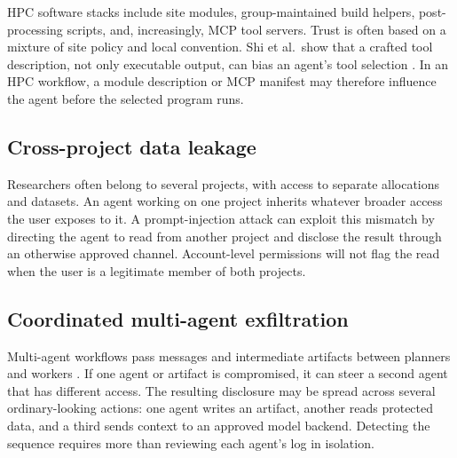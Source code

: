HPC software stacks include site modules, group-maintained build helpers, post-processing scripts, and, increasingly, MCP tool servers. Trust is often based on a mixture of site policy and local convention. Shi et al.\ show that a crafted tool description, not only executable output, can bias an agent's tool selection \cite{Shi2025ToolHijacker}. In an HPC workflow, a module description or MCP manifest may therefore influence the agent before the selected program runs.

\subsection{Cross-project data leakage}
\label{sec:cross-project}

Researchers often belong to several projects, with access to separate allocations and datasets. An agent working on one project inherits whatever broader access the user exposes to it. A prompt-injection attack can exploit this mismatch by directing the agent to read from another project and disclose the result through an otherwise approved channel. Account-level permissions will not flag the read when the user is a legitimate member of both projects.

\subsection{Coordinated multi-agent exfiltration}
\label{sec:taxonomy-multiagent}

Multi-agent workflows pass messages and intermediate artifacts between planners and workers \cite{Rosendo2025ORNL,Mondesire2025PEARC}. If one agent or artifact is compromised, it can steer a second agent that has different access. The resulting disclosure may be spread across several ordinary-looking actions: one agent writes an artifact, another reads protected data, and a third sends context to an approved model backend. Detecting the sequence requires more than reviewing each agent's log in isolation.

